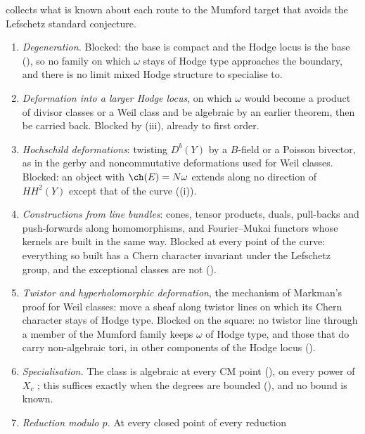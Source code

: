 \begin{remark}\label{rem:bypassaudit}
 collects what is known about each route to the Mumford
target that avoids the Lefschetz standard conjecture.
\begin{enumerate}[label=\textup{(\arabic*)},leftmargin=2.6em,itemsep=2pt]
\item \emph{Degeneration.} Blocked: the base is compact and the Hodge locus is
  the base (), so no family on which $\omega$ stays
  of Hodge type approaches the boundary, and there is no limit mixed Hodge
  structure to specialise to.
\item \emph{Deformation into a larger Hodge locus}, on which $\omega$ would
  become a product of divisor classes or a Weil class and be algebraic by
  an earlier theorem, then be carried back. Blocked by
  (iii), already to first order.
\item \emph{Hochschild deformations}: twisting $D^{b}(Y)$ by a $B$-field or a
  Poisson bivector, as in the gerby and noncommutative deformations used for
  Weil classes. Blocked: an object with $\ch(E)=N\omega$ extends along no
  direction of $HH^{2}(Y)$ except that of the curve
  ((i)).
\item \emph{Constructions from line bundles}: cones, tensor products, duals,
  pull-backs and push-forwards along homomorphisms, and Fourier--Mukai
  functors whose kernels are built in the same way. Blocked at every point of
  the curve: everything so built has a Chern character invariant under the
  Lefschetz group, and the exceptional classes are not
  ().
\item \emph{Twistor and hyperholomorphic deformation}, the mechanism of
  Markman's proof for Weil classes: move a sheaf along twistor lines on which
  its Chern character stays of Hodge type. Blocked on the square: no twistor
  line through a member of the Mumford family keeps $\omega$ of Hodge type,
  and those that do carry non-algebraic tori, in other components of the
  Hodge locus ().
\item \emph{Specialisation.} The class is algebraic at every CM point
  (), on every power of $X_{c}$ \cite[Theorem~1.3]{Li26};
  this suffices exactly when the degrees are bounded
  (), and no bound is known.
\item \emph{Reduction modulo $p$.} At every closed point of every reduction

\end{enumerate}
\end{remark}
